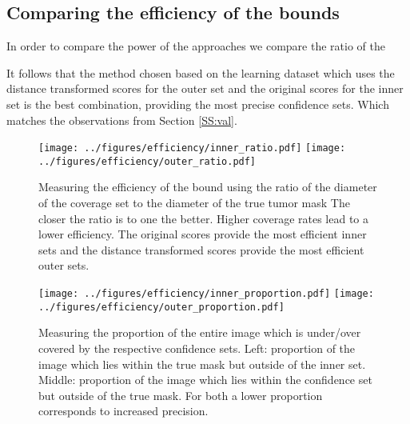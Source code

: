 
\subsection{Comparing the efficiency of the bounds}
In order to compare the power of the approaches we compare the ratio of the 

It follows that the method chosen based on the learning dataset which uses the distance transformed scores for the outer set and the original scores for the inner set is the best combination, providing the most precise confidence sets. Which matches the observations from Section \ref{SS:val}. 

\begin{figure}
	\begin{center}
			\texttt{[image: ../figures/efficiency/inner\_ratio.pdf]}
			\quad\quad
		\texttt{[image: ../figures/efficiency/outer\_ratio.pdf]}
	\end{center}
	\caption{Measuring the efficiency of the bound using the ratio of the diameter of the coverage set to the diameter of the true tumor mask The closer the ratio is to one the better. Higher coverage rates lead to a lower efficiency. The original scores provide the most efficient inner sets and the distance transformed scores provide the most efficient outer sets.}\label{fig:efficiency}
\end{figure}

\begin{figure}
	\begin{center}
		\texttt{[image: ../figures/efficiency/inner\_proportion.pdf]}
		\quad\quad
		\texttt{[image: ../figures/efficiency/outer\_proportion.pdf]}
	\end{center}
	\caption{Measuring the proportion of the entire image which is under/over covered by the respective confidence sets. Left: proportion of the image which lies within the true mask but outside of the inner set. Middle: proportion of the image which lies within the confidence set but outside of the true mask. For both a lower proportion corresponds to increased precision. }\label{fig:efficiency2}
\end{figure}

